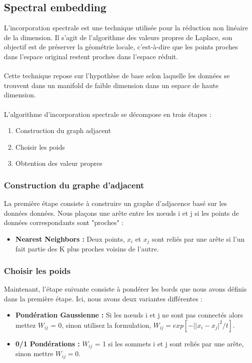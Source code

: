         \subsection*{Spectral embedding}
        L'incorporation spectrale est une technique utilisée pour la réduction non linéaire de la dimension. Il s'agit de l'algorithme des valeurs propres de Laplace, son objectif est de préserver la géométrie locale, c'est-à-dire que les points proches dans l'espace original restent proches dans l'espace réduit.
        \\
        \\
        Cette technique repose sur l'hypothèse de base selon laquelle les données se trouvent dans un manifold de faible dimension dans un espace de haute dimension. 
        \\
        \\
        L'algorithme d'incorporation spectrale se décompose en trois étapes :
        \begin{enumerate}
            \item Construction du graph adjacent
            \item Choisir les poids
            \item Obtention des valeur propres
        \end{enumerate}

            \subsubsection*{Construction du graphe d'adjacent}
            La première étape consiste à construire un graphe d'adjacence basé sur les données données. Nous plaçons une arête entre les nœuds i et j si les points de données correspondants sont "proches" : 
            \begin{itemize}
                \item \textbf{Nearest Neighbors :} Deux points, $x_i$ et $x_j$ sont reliés par une arête si l'un fait partie des K plus proches voisins de l'autre.
            \end{itemize}


            \subsubsection*{Choisir les poids}
            Maintenant, l'étape suivante consiste à pondérer les bords que nous avons définis dans la première étape. Ici, nous avons deux variantes différentes :
            \begin{itemize}
                \item \textbf{Pondération Gaussienne :} Si les nœuds i et j ne sont pas connectés alors mettez $W_{ij}$ = 0, sinon utilisez la formulation, $W_{ij} = exp[-||x_i - x_j|^2/ t]$.
                \item \textbf{0/1 Pondérations :} $W_{ij}$ = 1 si les sommets i et j sont reliés par une arête, sinon mettre $W_{ij} = 0$.
            \end{itemize}



